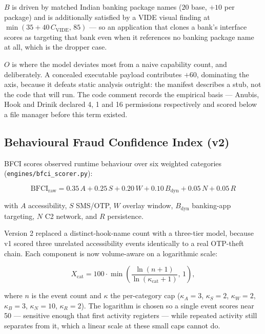 \documentclass{article}
\begin{document}
$B$ is driven by matched Indian banking package names ($20$ base, $+10$ per
package) and is additionally satisfied by a VIDE visual finding at
$\min(35 + 40\,C_{\mathrm{VIDE}},\, 85)$ --- so an application that clones a
bank's interface scores as targeting that bank even when it references no
banking package name at all, which is the dropper case.

$O$ is where the model deviates most from a naive capability count, and
deliberately. A concealed executable payload contributes $+60$, dominating the
axis, because it defeats static analysis outright: the manifest describes a
stub, not the code that will run. The code comment records the empirical basis
--- Anubis, Hook and Drinik declared 4, 1 and 16 permissions respectively and
scored below a file manager before this term existed.

\subsection{Behavioural Fraud Confidence Index (v2)}
\label{ssec:bfci}

BFCI scores observed runtime behaviour over six weighted categories
(\texttt{engines/bfci\_scorer.py}):

\begin{equation}
\mathrm{BFCI}_{\mathrm{raw}} = 0.35\,A + 0.25\,S + 0.20\,W
 + 0.10\,B_{\mathrm{dyn}} + 0.05\,N + 0.05\,R
\label{eq:bfci}
\end{equation}

with $A$ accessibility, $S$ SMS/OTP, $W$ overlay window, $B_{\mathrm{dyn}}$
banking-app targeting, $N$ C2 network, and $R$ persistence.

Version 2 replaced a distinct-hook-name count with a three-tier model, because
v1 scored three unrelated accessibility events identically to a real OTP-theft
chain. Each component is now volume-aware on a logarithmic scale:

\begin{equation}
X_{\mathrm{cat}} = 100 \cdot \min\!\left(
\frac{\ln(n+1)}{\ln(\kappa_{\mathrm{cat}}+1)},\, 1\right),
\label{eq:component}
\end{equation}

where $n$ is the event count and $\kappa$ the per-category cap
($\kappa_A = 3$, $\kappa_S = 2$, $\kappa_W = 2$, $\kappa_B = 3$,
$\kappa_N = 10$, $\kappa_R = 2$). The logarithm is chosen so a single event
scores near 50 --- sensitive enough that first activity registers --- while
repeated activity still separates from it, which a linear scale at these small
caps cannot do.
\end{document}
